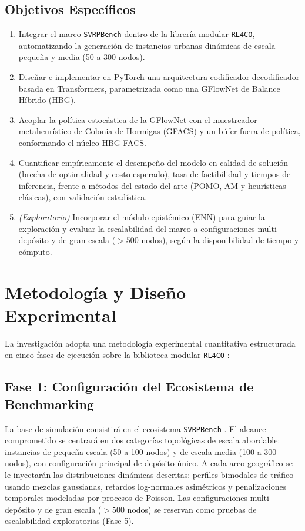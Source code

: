 \documentclass[12pt]{report}
\begin{document}
\section*{Objetivos Espec\'ificos}
\begin{enumerate}[label=\textbf{OE\arabic*.},leftmargin=1.8cm,itemsep=0.5em]
  \item Integrar el marco \texttt{SVRPBench} dentro de la librer\'ia modular \texttt{RL4CO}, automatizando la generaci\'on de instancias urbanas din\'amicas de escala peque\~na y media (50 a 300 nodos).
  \item Dise\~nar e implementar en PyTorch una arquitectura codificador-decodificador basada en Transformers, parametrizada como una GFlowNet de Balance H\'ibrido (HBG).
  \item Acoplar la pol\'itica estoc\'astica de la GFlowNet con el muestreador metaheur\'istico de Colonia de Hormigas (GFACS) y un b\'ufer fuera de pol\'itica, conformando el n\'ucleo HBG-FACS.
  \item Cuantificar emp\'iricamente el desempe\~no del modelo en calidad de soluci\'on (brecha de optimalidad y costo esperado), tasa de factibilidad y tiempos de inferencia, frente a m\'etodos del estado del arte (POMO, AM y heur\'isticas cl\'asicas), con validaci\'on estad\'istica.
  \item \textit{(Exploratorio)} Incorporar el m\'odulo epist\'emico (ENN) para guiar la exploraci\'on y evaluar la escalabilidad del marco a configuraciones multi-dep\'osito y de gran escala ($>500$ nodos), seg\'un la disponibilidad de tiempo y c\'omputo.
\end{enumerate}

\chapter*{Metodolog\'ia y Dise\~no Experimental}

La investigaci\'on adopta una metodolog\'ia experimental cuantitativa estructurada en cinco fases de ejecuci\'on sobre la biblioteca modular \texttt{RL4CO} \cite{Berto2023RL4CO}:

\section*{Fase 1: Configuraci\'on del Ecosistema de Benchmarking}
La base de simulaci\'on consistir\'a en el ecosistema \texttt{SVRPBench} \cite{Heakl2025SVRP}. El alcance comprometido se centrar\'a en dos categor\'ias topol\'ogicas de escala abordable: instancias de peque\~na escala (50 a 100 nodos) y de escala media (100 a 300 nodos), con configuraci\'on principal de dep\'osito \'unico. A cada arco geogr\'afico se le inyectar\'an las distribuciones din\'amicas descritas: perfiles bimodales de tr\'afico usando mezclas gaussianas, retardos log-normales asim\'etricos y penalizaciones temporales modeladas por procesos de Poisson. Las configuraciones multi-dep\'osito y de gran escala ($>500$ nodos) se reservan como pruebas de escalabilidad exploratorias (Fase 5).
\end{document}
